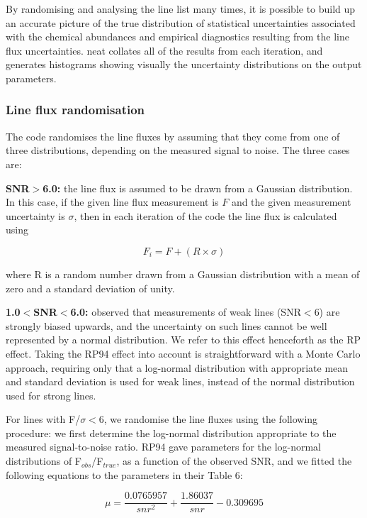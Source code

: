\documentclass[useAMS,usenatbib]{mn2e}
\begin{document}
By randomising and analysing the line list many times, it is possible to build up an accurate picture of the true distribution of statistical uncertainties associated with the chemical abundances and empirical diagnostics resulting from the line flux uncertainties. {\sc neat} collates all of the results from each iteration, and generates histograms showing visually the uncertainty distributions on the output parameters.

\subsubsection{Line flux randomisation}
\label{randomising}

The code randomises the line fluxes by assuming that they come from one of three distributions, depending on the measured signal to noise.  The three cases are:

{\bf SNR$>$6.0: } the line flux is assumed to be drawn from a Gaussian distribution.  In this case, if the given line flux measurement is $F$ and the given measurement uncertainty is $\sigma$, then in each iteration of the code the line flux is calculated using

\begin{equation}
F_i = F + (R\times\sigma)
\end{equation}

where R is a random number drawn from a Gaussian distribution with a mean of zero and a standard deviation of unity.

{\bf 1.0$<$SNR$<$6.0: } \citet[][hereafter RP94]{1994A&A...287..676R} observed that measurements of weak lines (SNR$<$6) are strongly biased upwards, and the uncertainty on such lines cannot be well represented by a normal distribution.  We refer to this effect henceforth as the RP effect.  Taking the RP94 effect into account is straightforward with a Monte Carlo approach, requiring only that a log-normal distribution with appropriate mean and standard deviation is used for weak lines, instead of the normal distribution used for strong lines.

For lines with F/$\sigma < $6, we randomise the line fluxes using the following procedure: we first determine the log-normal distribution appropriate to the measured signal-to-noise ratio.  RP94 gave parameters for the log-normal distributions of F$_{obs}$/F$_{true}$, as a function of the observed SNR, and we fitted the following equations to the parameters in their Table 6:

\begin{equation}
\mu = \frac{0.0765957}{snr^2} + \frac{1.86037}{snr} - 0.309695
\end{equation}
\end{document}
